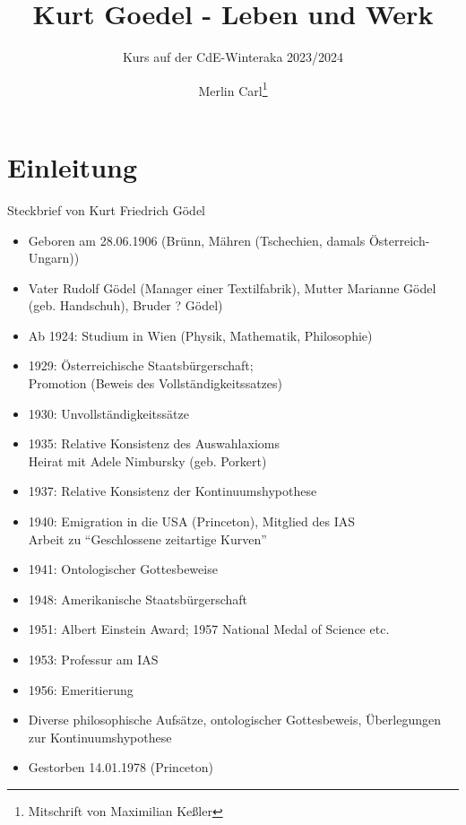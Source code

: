 \documentclass[ngerman]{scrartcl}
\title{Kurt Goedel - Leben und Werk}
\subtitle{Kurs auf der CdE-Winteraka 2023/2024}
\author{Merlin Carl\thanks{Mitschrift von Maximilian Keßler}}
\begin{document}
  \maketitle

  \cleardoublepage

  \tableofcontents

  \cleardoublepage



\section{Einleitung}

\large{Steckbrief von Kurt Friedrich Gödel}

\begin{itemize}
  \item Geboren am 28.06.1906 (Brünn, Mähren (Tschechien, damals Österreich-Ungarn))
  \item Vater Rudolf Gödel (Manager einer Textilfabrik), Mutter Marianne Gödel (geb. Handschuh), Bruder  ? Gödel)
  \item Ab 1924: Studium in Wien (Physik, Mathematik, Philosophie)
  \item 1929: Österreichische Staatsbürgerschaft; \\
    Promotion (Beweis des Vollständigkeitssatzes)
  \item 1930: Unvollständigkeitssätze
  \item 1935: Relative Konsistenz des Auswahlaxioms \\
    Heirat mit Adele Nimbursky (geb. Porkert)
  \item 1937: Relative Konsistenz der Kontinuumshypothese
  \item 1940: Emigration in die USA (Princeton), Mitglied des IAS \\
    Arbeit zu \enquote{Geschlossene zeitartige Kurven}
  \item 1941: Ontologischer Gottesbeweise
  \item 1948: Amerikanische Staatsbürgerschaft
  \item 1951: Albert Einstein Award; 1957 National Medal of Science etc.
  \item 1953: Professur am IAS
  \item 1956: Emeritierung
  \item Diverse philosophische Aufsätze, ontologischer Gottesbeweis, Überlegungen zur Kontinuumshypothese
  \item Gestorben 14.01.1978 (Princeton)
\end{itemize}
\end{document}
